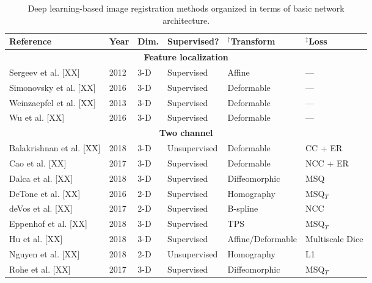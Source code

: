

\begin{table}[!htb]
\centering
\caption{Deep learning-based image registration methods organized in terms of basic
         network architecture.}
\label{table:methods}
\begin{tabular*}{\textwidth}{l@{\extracolsep{\fill}}l@{\extracolsep{\fill}}l@{\extracolsep{\fill}}l@{\extracolsep{\fill}}l@{\extracolsep{\fill}}l}
\toprule
\midrule
\textbf{Reference} & \textbf{Year} & \textbf{Dim.} & \textbf{Supervised?} & $^\dagger$\textbf{Transform} & $^\ddagger$\textbf{Loss} \\
\midrule
\midrule
\multicolumn{6}{c}{\textbf{Feature localization}}
  \vspace{0.25cm} \\
  Sergeev et al. [XX] & 2012 & 3-D & Supervised & Affine & --- \\
  Simonovsky et al. [XX] & 2016 & 3-D & Supervised & Deformable & --- \\
  Weinzaepfel et al. [XX] & 2013 & 3-D & Supervised & Deformable & --- \\
  Wu et al. [XX] & 2016 & 3-D & Supervised & Deformable & --- \\
\midrule
\multicolumn{6}{c}{\textbf{Two channel}}
  \vspace{0.25cm} \\
  Balakrishnan et al. [XX] & 2018 & 3-D & Unsupervised & Deformable & CC + ER \\
  Cao et al. [XX] & 2017 & 3-D & Supervised & Deformable & NCC + ER \\
  Dalca et al. [XX] & 2018 & 3-D & Supervised & Diffeomorphic & MSQ \\
  DeTone et al. [XX] & 2016 & 2-D & Supervised & Homography & MSQ$_T$ \\ %
  deVos et al. [XX] & 2017 & 2-D & Supervised & B-spline & NCC \\
  Eppenhof et al. [XX] & 2018 & 3-D & Supervised & TPS & MSQ$_T$ \\       %
  Hu et al. [XX] & 2018 & 3-D & Supervised & Affine/Deformable & Multiscale Dice \\
  Nguyen et al. [XX] & 2018 & 2-D & Unsupervised & Homography & L1 \\
  Rohe et al. [XX] & 2017 & 3-D & Supervised & Diffeomorphic & MSQ$_T$ \\  %

\end{tabular*}
\end{table}
